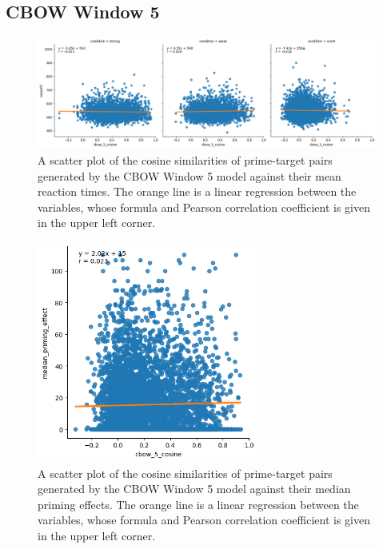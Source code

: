 \documentclass{IEEEtran}
\begin{document}
\subsection*{CBOW Window 5}
\begin{figure}[h]
    \centering
    \includegraphics[width=\textwidth]{images/cbow_5_cosine_against_meanrt.png}
    \caption{A scatter plot of the cosine similarities of prime-target pairs generated by the CBOW Window 5 model against their mean reaction times. The orange line is a linear regression between the variables, whose formula and Pearson correlation coefficient is given in the upper left corner.}
\end{figure}
\begin{figure}[h]
    \centering
    \includegraphics[width=0.65\textwidth]{images/cbow_5_cosine_against_priming_effect.png}
    \caption{A scatter plot of the cosine similarities of prime-target pairs generated by the CBOW Window 5 model against their median priming effects. The orange line is a linear regression between the variables, whose formula and Pearson correlation coefficient is given in the upper left corner.}
\end{figure}

\newpage
\end{document}
